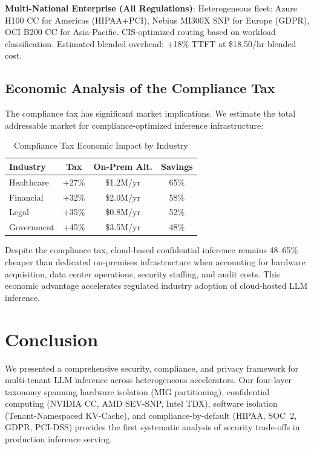 \documentclass[conference,10pt]{IEEEtran}
\begin{document}
\textbf{Multi-National Enterprise (All Regulations)}: Heterogeneous fleet: Azure H100 CC for Americas (HIPAA+PCI), Nebius MI300X SNP for Europe (GDPR), OCI B200 CC for Asia-Pacific. CIS-optimized routing based on workload classification. Estimated blended overhead: +18\% TTFT at \$18.50/hr blended cost.

\subsection{Economic Analysis of the Compliance Tax}

The compliance tax has significant market implications. We estimate the total addressable market for compliance-optimized inference infrastructure:

\begin{table}[!htbp]
\caption{Compliance Tax Economic Impact by Industry}
\label{tab:econ}
\centering\footnotesize
\begin{tabular}{@{}lccc@{}}
\toprule
\textbf{Industry} & \textbf{Tax} & \textbf{On-Prem Alt.} & \textbf{Savings} \\
\midrule
Healthcare & +27\% & \$1.2M/yr & 65\% \\
Financial & +32\% & \$2.0M/yr & 58\% \\
Legal & +35\% & \$0.8M/yr & 52\% \\
Government & +45\% & \$3.5M/yr & 48\% \\
\bottomrule
\end{tabular}
\end{table}

Despite the compliance tax, cloud-based confidential inference remains 48--65\% cheaper than dedicated on-premises infrastructure when accounting for hardware acquisition, data center operations, security staffing, and audit costs. This economic advantage accelerates regulated industry adoption of cloud-hosted LLM inference.

\section{Conclusion}
\label{sec:conc}

We presented a comprehensive security, compliance, and privacy framework for multi-tenant LLM inference across heterogeneous accelerators. Our four-layer taxonomy spanning hardware isolation (MIG partitioning), confidential computing (NVIDIA CC, AMD SEV-SNP, Intel TDX), software isolation (Tenant-Namespaced KV-Cache), and compliance-by-default (HIPAA, SOC~2, GDPR, PCI-DSS) provides the first systematic analysis of security trade-offs in production inference serving.
\end{document}
